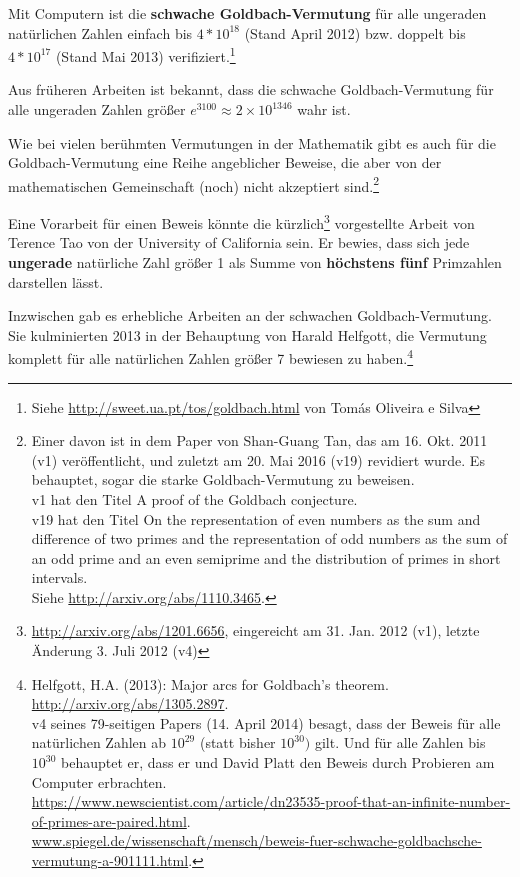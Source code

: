 \begin{refsegment}
\noindent Mit Computern ist die \textbf{schwache Goldbach-Vermutung} für alle
ungeraden natürlichen Zahlen einfach bis $4*10^{18}$ (Stand April 2012) bzw.
doppelt bis  $4*10^{17}$ (Stand Mai 2013) verifiziert.\footnote{%
Siehe \url{http://sweet.ua.pt/tos/goldbach.html} von Tomás Oliveira e Silva
     }

Aus früheren Arbeiten ist bekannt, dass die schwache Goldbach-Vermutung
für alle ungeraden Zahlen größer $e^{3100}\approx 2 \times 10^{1346}$ wahr ist.

Wie bei vielen berühmten Vermutungen in der Mathematik gibt es auch für die
Goldbach-Vermutung eine Reihe angeblicher Beweise, die aber von der
mathematischen Gemeinschaft (noch) nicht akzeptiert sind.\footnote{%
Einer davon ist in dem Paper von Shan-Guang Tan, das am 16. Okt. 2011 (v1)
veröffentlicht, und zuletzt am 20. Mai 2016 (v19) revidiert wurde. Es
behauptet, sogar die starke Goldbach-Vermutung zu beweisen.\\
v1 hat den Titel \glqq A proof of the Goldbach conjecture\grqq.\\
v19 hat den Titel \glqq On the representation of even numbers as the sum and
difference of two primes and the representation of odd numbers as the sum of
an odd prime and an even semiprime and the distribution of primes in short
intervals\grqq.\\
Siehe \url{http://arxiv.org/abs/1110.3465}.
   }

Eine Vorarbeit für einen Beweis könnte die
kürzlich\footnote{\url{http://arxiv.org/abs/1201.6656}, eingereicht am
31. Jan. 2012 (v1), letzte Änderung 3. Juli 2012 (v4)} vorgestellte Arbeit
von Terence Tao von der University of California sein.
Er bewies, dass sich jede \textbf{ungerade} natürliche Zahl größer 1 als
Summe von \textbf{höchstens fünf} Primzahlen darstellen lässt.

Inzwischen gab es erhebliche Arbeiten an der schwachen Goldbach-Vermutung. Sie
kulminierten 2013 in der Behauptung von Harald Helfgott, die Vermutung komplett
für alle natürlichen Zahlen größer 7 bewiesen zu haben.\footnote{%
Helfgott, H.A. (2013): \glqq Major arcs for Goldbach's theorem\grqq.
\url{http://arxiv.org/abs/1305.2897}.\\
v4 seines 79-seitigen Papers (14. April 2014) besagt, dass der Beweis für alle
natürlichen Zahlen ab $10^{29}$ (statt bisher $10^{30})$ gilt. Und für alle
Zahlen bis $10^{30}$ behauptet er, dass er und David Platt den Beweis durch
Probieren am Computer erbrachten.
\\
\url{https://www.newscientist.com/article/dn23535-proof-that-an-infinite-number-of-primes-are-paired.html}.\\
\url{www.spiegel.de/wissenschaft/mensch/beweis-fuer-schwache-goldbachsche-vermutung-a-901111.html}.
}




\end{refsegment}
